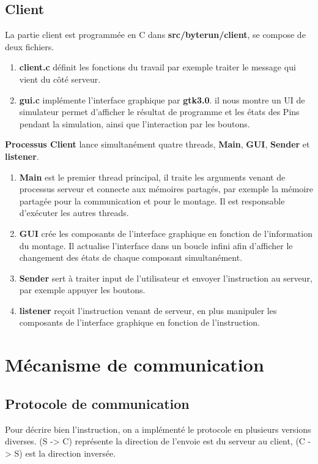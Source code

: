 \documentclass[14px]{article}
\begin{document}
	\subsection{Client}
	La partie client est programmée en C dans \textbf{src/byterun/client}, se compose de deux fichiers.
	\begin{enumerate}
		\item \textbf{client.c} définit les fonctions du travail par exemple traiter le message qui vient du côté serveur.

		\item \textbf{gui.c} implémente l'interface graphique par \textbf{gtk3.0}.
		il nous montre un UI de simulateur permet d'afficher le résultat de programme et les états des Pins pendant la simulation, ainsi que l'interaction par les boutons.\\
	\end{enumerate}

	\textbf{Processus Client} lance simultanément quatre threads, \textbf{Main}, \textbf{GUI}, \textbf{Sender} et \textbf{listener}.
	\begin{enumerate}
		\item \textbf{Main} est le premier thread principal, il traite les arguments venant de processus serveur et connecte aux mémoires partagés, par exemple la mémoire partagée pour la communication et pour le montage. Il est responsable d'exécuter les autres threads.
		\item \textbf{GUI} crée les composants de l'interface graphique en fonction de l'information du montage. Il actualise l'interface dans un boucle infini afin d'afficher le changement des états de chaque composant simultanément.
		\item \textbf{Sender} sert à traiter input de l'utilisateur et envoyer l'instruction au serveur, par exemple appuyer les boutons.
		\item \textbf{listener} reçoit l'instruction venant de serveur, en plus manipuler les composants de l'interface graphique en fonction de l'instruction.
	\end{enumerate}


	\pagestyle{fancy}
	\rhead{\thepage}
	\fancyfoot{}

	\section{Mécanisme de communication}
	\subsection{Protocole de communication}
	Pour décrire bien l'instruction, on a implémenté le protocole en plusieurs versions diverses. (S -> C) représente la direction de l'envoie est du serveur au client, (C -> S) est la direction inversée.
\end{document}
